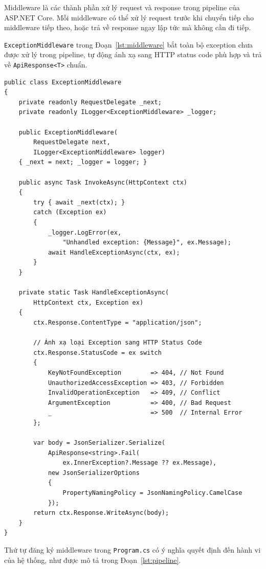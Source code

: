 \begin{de}\label{def3.3}
Middleware là các thành phần xử lý request và response trong
pipeline của ASP.NET Core. Mỗi middleware có thể xử lý request
trước khi chuyển tiếp cho middleware tiếp theo, hoặc trả về
response ngay lập tức mà không cần đi tiếp.
\end{de}

\texttt{ExceptionMiddleware} trong Đoạn~\ref{lst:middleware}
bắt toàn bộ exception chưa được xử lý trong pipeline, tự động
ánh xạ sang HTTP status code phù hợp và trả về
\texttt{ApiResponse<T>} chuẩn.

\begin{lstlisting}[style=csharp,
  caption={ExceptionMiddleware -- xử lý lỗi tập trung},
  label={lst:middleware}]
public class ExceptionMiddleware
{
    private readonly RequestDelegate _next;
    private readonly ILogger<ExceptionMiddleware> _logger;

    public ExceptionMiddleware(
        RequestDelegate next,
        ILogger<ExceptionMiddleware> logger)
    { _next = next; _logger = logger; }

    public async Task InvokeAsync(HttpContext ctx)
    {
        try { await _next(ctx); }
        catch (Exception ex)
        {
            _logger.LogError(ex,
                "Unhandled exception: {Message}", ex.Message);
            await HandleExceptionAsync(ctx, ex);
        }
    }

    private static Task HandleExceptionAsync(
        HttpContext ctx, Exception ex)
    {
        ctx.Response.ContentType = "application/json";

        // Ánh xạ loại Exception sang HTTP Status Code
        ctx.Response.StatusCode = ex switch
        {
            KeyNotFoundException        => 404, // Not Found
            UnauthorizedAccessException => 403, // Forbidden
            InvalidOperationException   => 409, // Conflict
            ArgumentException           => 400, // Bad Request
            _                           => 500  // Internal Error
        };

        var body = JsonSerializer.Serialize(
            ApiResponse<string>.Fail(
                ex.InnerException?.Message ?? ex.Message),
            new JsonSerializerOptions
            {
                PropertyNamingPolicy = JsonNamingPolicy.CamelCase
            });
        return ctx.Response.WriteAsync(body);
    }
}
\end{lstlisting}

Thứ tự đăng ký middleware trong \texttt{Program.cs} có ý nghĩa
quyết định đến hành vi của hệ thống, như được mô tả trong
Đoạn~\ref{lst:pipeline}.


